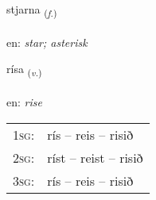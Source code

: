 \documentclass[frontgrid, backgrid]{flacards}\usepackage[]{graphicx}\usepackage[]{color}
\begin{document}
\renewcommand{\flhead}{\vskip5pt \fboxsep=0pt {\small\bfseries\footnotesize Nafnorð | Noun}}
\renewcommand{\fcfoot}{\vskip5pt \fboxsep=0pt \hspace{2pt}{\small\bfseries\footnotesize 2K}}

\renewcommand{\blhead}{\vskip5pt {\small\bfseries\footnotesize Nafnorð | Noun }}
\renewcommand{\bcfoot}{\vskip5pt \hspace{2pt}{\small\bfseries\footnotesize 2K}}


{stjarna \small{\textsubscript{(\textit{f.})}} \\[1ex] %
\textphonetic{[stjartna]} \\
en: \emph{star; asterisk} \\  [2ex]
\renewcommand*{\arraystretch}{0.8}
}

\renewcommand{\flhead}{\vskip5pt \fboxsep=0pt {\small\bfseries\footnotesize Sagnorð | Verb}}
\renewcommand{\fcfoot}{\vskip5pt \fboxsep=0pt \hspace{2pt}{\small\bfseries\footnotesize 2K}}

\renewcommand{\blhead}{\vskip5pt {\small\bfseries\footnotesize Sagnorð | Verb }}
\renewcommand{\bcfoot}{\vskip5pt \hspace{2pt}{\small\bfseries\footnotesize 2K}}


{rísa \small{\textsubscript{(\textit{v.})}} \\[1ex] %
\textphonetic{[riːsa]} \\
en: \emph{rise} \\  [2ex]
\renewcommand*{\arraystretch}{0.8}
\begin{tabular}{p{1cm}l}
\textsc{1sg}: & rís -- reis -- risið \\ 
\textsc{2sg}: & ríst -- reist -- risið \\ 
\textsc{3sg}: & rís -- reis -- risið \\ 
\end{tabular}
}
\end{document}
